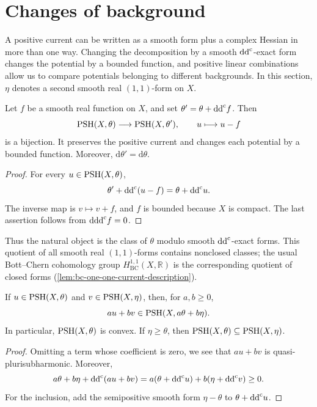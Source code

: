 \section{Changes of background}

A positive current can be written as a smooth form plus a complex Hessian in more than one way. Changing the decomposition by a smooth $\mathrm{dd}^{\mathrm{c}}$-exact form changes the potential by a bounded function, and positive linear combinations allow us to compare potentials belonging to different backgrounds. In this section, $\eta$ denotes a second smooth real $(1,1)$-form on $X$.

\begin{proposition}\label{prop:gauge}
Let $f$ be a smooth real function on $X$, and set $\theta'=\theta+\mathrm{dd}^{\mathrm{c}} f$. Then
\[
 \mathrm{PSH}(X,\theta)\longrightarrow\mathrm{PSH}(X,\theta'),
 \qquad u\longmapsto u-f
\]
is a bijection. It preserves the positive current and changes each potential by a bounded function. Moreover, $\mathrm{d}\theta'=\mathrm{d}\theta$.
\end{proposition}
\begin{proof}
For every $u\in\mathrm{PSH}(X,\theta)$,
\[
 \theta'+\mathrm{dd}^{\mathrm{c}}(u-f)=\theta+\mathrm{dd}^{\mathrm{c}} u.
\]
The inverse map is $v\mapsto v+f$, and $f$ is bounded because $X$ is compact. The last assertion follows from $\mathrm{d}\mathrm{dd}^{\mathrm{c}} f=0$.
\end{proof}

Thus the natural object is the class of $\theta$ modulo smooth $\mathrm{dd}^{\mathrm{c}}$-exact forms. This quotient of all smooth real $(1,1)$-forms contains nonclosed classes; the usual Bott--Chern cohomology group $H^{1,1}_{\mathrm{BC}}(X,\mathbb R)$ is the corresponding quotient of closed forms (\cref{lem:bc-one-one-current-description}).

\begin{proposition}\label{prop:convexity}
If $u\in\mathrm{PSH}(X,\theta)$ and $v\in\mathrm{PSH}(X,\eta)$, then, for $a,b\geq0$,
\[
 au+bv\in\mathrm{PSH}(X,a\theta+b\eta).
\]
In particular, $\mathrm{PSH}(X,\theta)$ is convex. If $\eta\geq\theta$, then $\mathrm{PSH}(X,\theta)\subseteq\mathrm{PSH}(X,\eta)$.
\end{proposition}
\begin{proof}
Omitting a term whose coefficient is zero, we see that $au+bv$ is quasi-plurisubharmonic. Moreover,
\[
 a\theta+b\eta+\mathrm{dd}^{\mathrm{c}}(au+bv)
 =a(\theta+\mathrm{dd}^{\mathrm{c}} u)+b(\eta+\mathrm{dd}^{\mathrm{c}} v)\geq0.
\]
For the inclusion, add the semipositive smooth form $\eta-\theta$ to $\theta+\mathrm{dd}^{\mathrm{c}} u$.
\end{proof}

